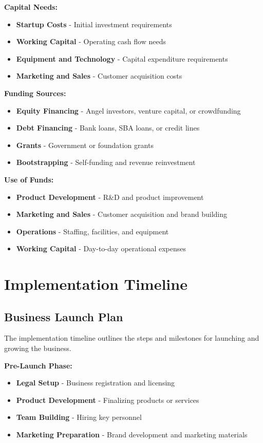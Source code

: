 \documentclass[12pt]{article}
\begin{document}
\textbf{Capital Needs:}
\begin{itemize}
    \item \textbf{Startup Costs} - Initial investment requirements
    \item \textbf{Working Capital} - Operating cash flow needs
    \item \textbf{Equipment and Technology} - Capital expenditure requirements
    \item \textbf{Marketing and Sales} - Customer acquisition costs
\end{itemize}

\textbf{Funding Sources:}
\begin{itemize}
    \item \textbf{Equity Financing} - Angel investors, venture capital, or crowdfunding
    \item \textbf{Debt Financing} - Bank loans, SBA loans, or credit lines
    \item \textbf{Grants} - Government or foundation grants
    \item \textbf{Bootstrapping} - Self-funding and revenue reinvestment
\end{itemize}

\textbf{Use of Funds:}
\begin{itemize}
    \item \textbf{Product Development} - R\&D and product improvement
    \item \textbf{Marketing and Sales} - Customer acquisition and brand building
    \item \textbf{Operations} - Staffing, facilities, and equipment
    \item \textbf{Working Capital} - Day-to-day operational expenses
\end{itemize}

\section{Implementation Timeline}

\subsection{Business Launch Plan}
The implementation timeline outlines the steps and milestones for launching and growing the business.

\textbf{Pre-Launch Phase:}
\begin{itemize}
    \item \textbf{Legal Setup} - Business registration and licensing
    \item \textbf{Product Development} - Finalizing products or services
    \item \textbf{Team Building} - Hiring key personnel
    \item \textbf{Marketing Preparation} - Brand development and marketing materials
\end{itemize}
\end{document}
